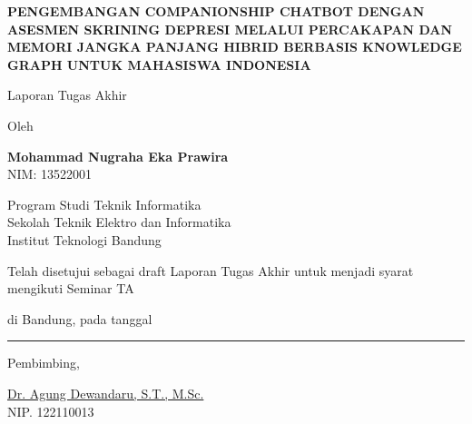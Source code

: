 \thispagestyle{empty}
\begin{center}
\vspace*{0.5cm}

{\bfseries\large
PENGEMBANGAN COMPANIONSHIP CHATBOT DENGAN ASESMEN SKRINING DEPRESI MELALUI PERCAKAPAN DAN MEMORI JANGKA PANJANG HIBRID BERBASIS KNOWLEDGE GRAPH UNTUK MAHASISWA INDONESIA
}

\vspace{1cm}

Laporan Tugas Akhir

\vspace{0.8cm}

Oleh

{\bfseries Mohammad Nugraha Eka Prawira} \\
NIM: 13522001

\vspace{0.5cm}

Program Studi Teknik Informatika \\
Sekolah Teknik Elektro dan Informatika \\
Institut Teknologi Bandung

\vspace{1cm}

Telah disetujui sebagai draft Laporan Tugas Akhir untuk menjadi syarat mengikuti Seminar TA

\vspace{0.4cm}

di Bandung, pada tanggal \rule{4cm}{0.4pt}

\vspace{1.5cm}

Pembimbing,

\vspace{2cm}

\underline{Dr. Agung Dewandaru, S.T., M.Sc.} \\
NIP. 122110013

\end{center}
